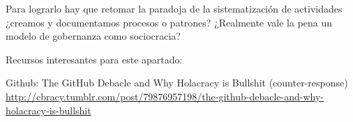 Para lograrlo hay que retomar la paradoja de la sistematización de actividades ¿creamos y documentamos procesos o patrones? ¿Realmente vale la pena un modelo de gobernanza como sociocracia?

Recursos interesantes para este apartado:

Github: The GitHub Debacle and Why Holacracy is Bullshit
(counter-response)
\url{http://cbracy.tumblr.com/post/79876957198/the-github-debacle-and-why-holacracy-is-bullshit}